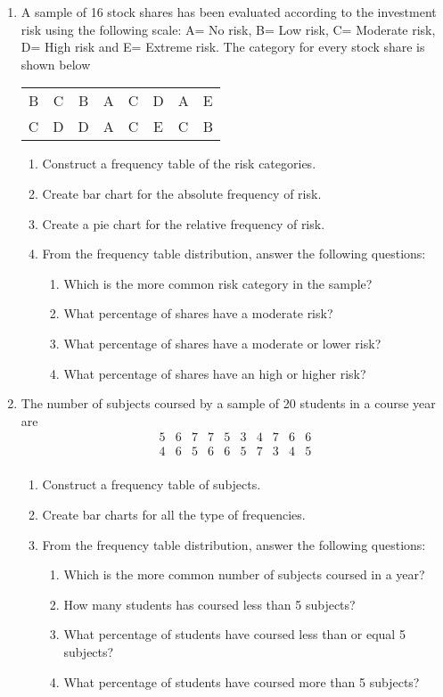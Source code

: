 \begin{enumerate}[leftmargin=*,resume]
\item A sample of 16 stock shares has been evaluated according to the investment risk using the following scale: A= No
risk, B= Low risk, C= Moderate risk, D= High risk and E= Extreme risk.
The category for every stock share is shown below
\begin{center}
\begin{tabular}{cccccccc}
B & C & B & A & C & D & A & E\\
C & D & D & A & C & E & C & B 
\end{tabular} 
\end{center}
\begin{enumerate}
\item Construct a frequency table of the risk categories.
\item Create bar chart for the absolute frequency of risk.
\item Create a pie chart for the relative frequency of risk. 
\item From the frequency table distribution, answer the following questions:
\begin{enumerate}
\item Which is the more common risk category in the sample?
\item What percentage of shares have a moderate risk?
\item What percentage of shares have a moderate or lower risk?
\item What percentage of shares have an high or higher risk?
\end{enumerate}
\end{enumerate}


\item The number of subjects coursed by a sample of 20 students in a course year are
\[
\begin{array}{cccccccccc}
5 & 6 & 7 & 7 & 5 & 3 & 4 & 7 & 6 & 6\\
4 & 6 & 5 & 6 & 6 & 5 & 7 & 3 & 4 & 5 \\
\end{array}
\]
\begin{enumerate}
\item Construct a frequency table of subjects.
\item Create bar charts for all the type of frequencies. 
\item From the frequency table distribution, answer the following questions:
\begin{enumerate}
\item Which is the more common number of subjects coursed in a year?
\item How many students has coursed less than 5 subjects?
\item What percentage of students have coursed less than or equal 5 subjects?
\item What percentage of students have coursed more than 5 subjects?
\end{enumerate}
\end{enumerate}



\end{enumerate}

